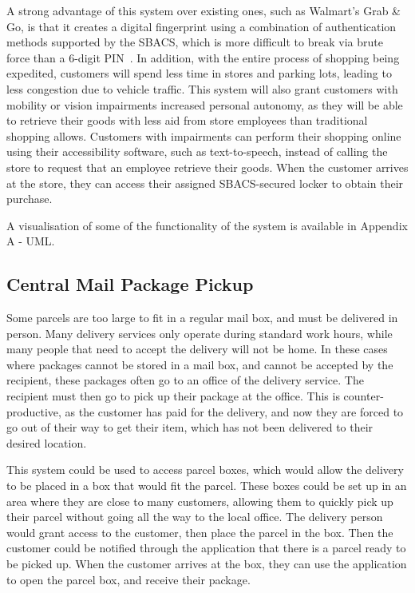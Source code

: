 \documentclass{article}
\begin{document}
A strong advantage of this system over existing ones, such as Walmart's Grab \& Go, is that it creates a digital 
fingerprint using a combination of authentication methods supported by the SBACS, which is more difficult to 
break via brute force than a 6-digit PIN~\autocite{WALMART}. In addition, with the entire process of shopping being 
expedited, customers will spend less time in stores and parking lots, leading to less congestion due to vehicle 
traffic. This system will also grant customers with mobility or vision impairments increased personal autonomy, as 
they will be able to retrieve their goods with less aid from store employees than traditional shopping allows. Customers
with impairments can perform their shopping online using their accessibility software, such as text-to-speech, instead 
of calling the store to request that an employee retrieve their goods. When the customer arrives at the store, they can
access their assigned SBACS-secured locker to obtain their purchase. \hfill \break

\noindent A visualisation of some of the functionality of the system is available in Appendix A - UML.

\subsection{Central Mail Package Pickup}

Some parcels are too large to fit in a regular mail box, and must be delivered in person. Many delivery services only 
operate during standard work hours, while many people that need to accept the delivery will not be home. In these cases 
where packages cannot be stored in a mail box, and cannot be accepted by the recipient, these packages often go to an office 
of the delivery service. The recipient must then go to pick up their package at the office. This is counter-productive, 
as the customer has paid for the delivery, and now they are forced to go out of their way to get their item, which has not 
been delivered to their desired location.

This system could be used to access parcel boxes, which would allow the delivery to be placed in a box that would fit 
the parcel. These boxes could be set up in an area where they are close to many customers, allowing them to quickly 
pick up their parcel without going all the way to the local office. The delivery person would grant access to the 
customer, then place the parcel in the box. Then the customer could be notified through the application that there is a 
parcel ready to be picked up. When the customer arrives at the box, they can use the application to open the parcel 
box, and receive their package.
\end{document}

